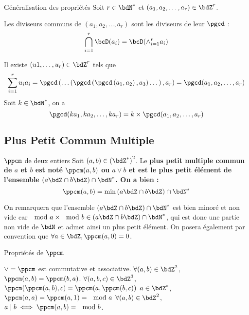 \documentclass[a4paper,french,bookmarks]{article}
\begin{document}
\begin{theorem}{Généralisation des propriétés}
    Soit $r \in \bdN^*$ et $(a_1, a_2, \dots, a_r) \in \bdZ^r$.
    
    \begin{enumerate}
        \itarr Les diviseurs communs de $(a_1, a_2, \dots, a_r)$ sont les diviseurs de leur $\pgcd$ :
        \[ \bigcap_{i=1}^r \bcD(a_i) = \bcD(\displaystyle \land_{i=1}^r a_i)\]
        
        \itarr {} Il existe $(u1, \dots, u_r) \in \bdZ^r$ tels que
        \[ \sum_{i=1}^r u_i a_i = \pgcd\left(\dots\left(\pgcd\left(\pgcd\left(a_1, a_2\right), a_3\right)\dots\right), a_r\right) = \pgcd(a_1, a_2, \dots, a_r)\]
        \itarr {} Soit $k \in \bdN^*$, on a 
        \[ \pgcd(ka_1, ka_2, \dots, ka_r) = k\times\pgcd(a_1, a_2, \dots, a_r)\]
    \end{enumerate}
\end{theorem}

\subsection{Plus Petit Commun Multiple}

\begin{definition}{$\ppcm$ de deux entiers}{}
    Soit $(a, b) \in \left(\bdZ^*\right)^2$. Le \bf{plus petit multiple commun} de $a$ et $b$ est noté $\ppcm(a, b)$ ou $a \lor b$ et est le plus petit élément de l'ensemble $\left(a\bdZ \cap b\bdZ\right) \cap \bdN^*$. On a bien :
    \[\ppcm(a, b) = \min\left(a\bdZ \cap b\bdZ\right) \cap \bdN^*\]
\end{definition}

On remarquera que l'ensemble $\left(a\bdZ \cap b\bdZ\right) \cap \bdN^*$ est bien minoré et non vide car $\mod{a} \times \mod{b} \in \left(a\bdZ \cap b\bdZ\right) \cap \bdN^*$, qui est donc une partie non vide de $\bdN$ et admet ainsi un plus petit élément. On posera également par convention que $\forall a \in \bdZ, \ppcm(a, 0) = 0$.

\begin{property}{Propriétés de $\ppcm$}{}
    \begin{enumerate}
        \itarr $\lor = \ppcm$ est commutative et associative.
        \itarr $\forall (a, b) \in \bdZ^2$, $\ppcm(a, b) = \ppcm(b, a)$.
        \itarr $\forall (a, b, c) \in \bdZ^3$, $\ppcm(\ppcm(a, b), c) = \ppcm(a, \ppcm(b, c))$
        \itarr \forall $a \in \bdZ^*$, $\ppcm(a, a) = \ppcm(a, 1) = \mod{a}$
        \itarr $\forall (a, b) \in \bdZ^2$, $a \mid b \iff \ppcm(a, b) = \mod{b}$.
    \end{enumerate}
\end{property}
\end{document}
